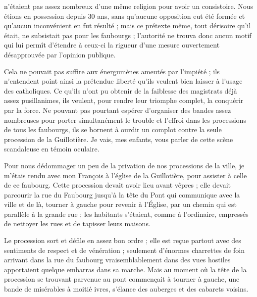 \documentclass[11pt,a4paper]{report}
\begin{document}
n'étaient pas assez nombreux d'une même religion pour avoir un consistoire. Nous étions en possession depuis 30 ans, sans qu'aucune opposition eut été formée et qu'aucun inconvénient en fut résulté ; mais ce prétexte même, tout dérisoire qu'il était, ne subsistait pas pour les faubourgs ; l'autorité ne trouva donc aucun motif qui lui permît d'étendre à ceux-ci la rigueur d'une mesure ouvertement désapprouvée par l'opinion publique.

Cela ne pouvait pas suffire aux énergumènes ameutés par l'impiété ; ils n'entendent point ainsi la prétendue liberté qu'ils veulent bien laisser à l'usage des catholiques. Ce qu'ils n'ont pu obtenir de la faiblesse des magistrats déjà assez pusillanimes, ils veulent, pour rendre leur triomphe complet, la conquérir par la force. Ne pouvant pas pourtant espérer d'organiser des bandes assez nombreuses pour porter simultanément le trouble et l'effroi dans les processions de tous les faubourgs, ils se bornent à ourdir un complot contre la seule procession de la Guillotière. Je vais, mes enfants, vous parler de cette scène scandaleuse en témoin oculaire.

Pour nous dédommager un peu de la privation de nos processions de la ville, je m'étais rendu avec mon François à l'église de la Guillotière, pour assister à celle de ce faubourg. Cette procession devait avoir lieu avant vêpres ; elle devait parcourir la rue du Faubourg jusqu'à la tête du Pont qui communique avec la ville et de là, tourner à gauche pour revenir à l'Église, par un chemin qui est parallèle à la grande rue ; les habitants s'étaient, comme à l'ordinaire, empressés de nettoyer les rues et de tapisser leurs maisons.

Le procession sort et défile en assez bon ordre ; elle est reçue partout avec des sentiments de respect et de vénération ; seulement d'énormes charrettes de foin arrivant dans la rue du faubourg vraisemblablement dans des vues hostiles apportaient quelque embarras dans sa marche. Mais au moment où la tête de la procession se trouvant parvenue au pont commençait à tourner à gauche, une bande de misérables à moitié ivres, s'élance des auberges et des cabarets voisins.
\end{document}
